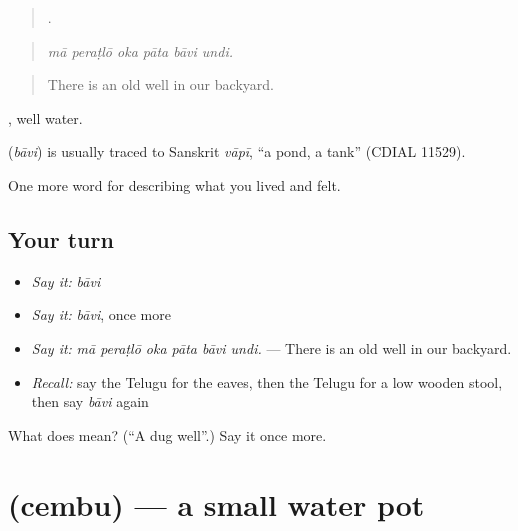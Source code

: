 \begin{quote}
     .
\end{quote}

\begin{quote}
\emph{mā peraṭlō oka pāta bāvi undi.}
\end{quote}

\begin{quote}
There is an old well in our backyard.
\end{quote}

 , well water.

\begin{cousinweb}
\textbf{} (\emph{bāvi}) is usually traced to Sanskrit \emph{vāpī}, \textquotedblleft{}a pond, a tank\textquotedblright{} (CDIAL 11529).
\end{cousinweb}

\begin{grammarlens}[title={What you've built}]
One more word for describing what you lived and felt.
\end{grammarlens}

\subsection*{Your turn}
\begin{itemize}
\raggedright
  \item \emph{Say it:} \emph{bāvi}
  \item \emph{Say it:} \emph{bāvi}, once more
  \item \emph{Say it:} \emph{mā peraṭlō oka pāta bāvi undi.} — There is an old well in our backyard.
  \item \emph{Recall:} say the Telugu for the eaves, then the Telugu for a low wooden stool, then say \emph{bāvi} again
\end{itemize}

\begin{tcolorbox}[breakable,colback=teal!4,colframe=teal!35!black,title={Before you move on}]
What does  mean? (\textquotedblleft{}A dug well\textquotedblright{}.) Say it once more.
\end{tcolorbox}
\section[\texorpdfstring{\te{చెంబు} (cembu)}{చెంబు (cembu)}]{ (cembu) — a small water pot}

\label{lesson:TE-C546-cembu}



